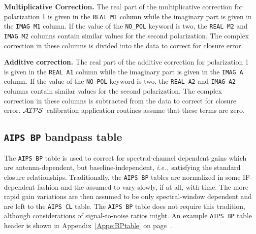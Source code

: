 \documentclass[twoside]{article}
\newcommand{\AIPS}{{$\cal AIPS\/$}}
\newcommand{\ie}{{\it i.e.},}
\begin{document}
{\bf Multiplicative Correction.}  The real part of the multiplicative
correction for polarization 1 is given in the {\tt REAL M1} column
while the imaginary part is given in the {\tt IMAG M1} column.  If the
value of the {\tt NO\_POL} keyword is two, the {\tt REAL M2} and {\tt
  IMAG M2} columns contain similar values for the second polarization.
The complex correction in these columns is divided into the data to
correct for closure error.

{\bf Additive correction.}  The real part of the additive correction
for polarization 1 is given in the {\tt REAL A1} column while the
imaginary  part is given in the {\tt IMAG A} column.  If the value of
the {\tt NO\_POL} keyword is two, the {\tt REAL A2} and {\tt IMAG A2}
columns contain similar values for the second polarization.  The
complex correction in these columns is subtracted from the data to
correct for closure error.  \AIPS\ calibration application routines
assume that these terms are zero.

\subsection{{\tt AIPS BP} bandpass table}
\label{s:BP}

The {\tt AIPS BP} table is used to correct for spectral-channel
dependent gains which are antenna-dependent, but baseline-independent,
\ie\ satisfying the standard closure relationships.  Traditionally, the
{\tt AIPS BP} tables are normalized in some IF-dependent fashion and
the assumed to vary slowly, if at all, with time.  The more rapid gain
variations are then assumed to be only spectral-window dependent and
are left to the {\tt AIPS CL} table.  The {\tt AIPS BP} table does not
require this tradition, although considerations of signal-to-noise
ratios might.  An example {\tt AIPS BP} table header is shown in
Appendix~\ref{Appe:BPtable} on page~\pageref{Appe:BPtable}.
\vfill\eject
\end{document}
